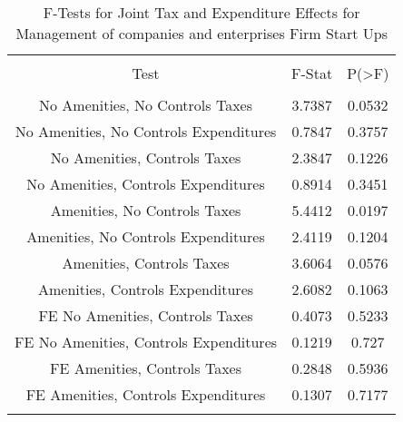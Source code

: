 
\begin{table}[!htbp] \centering 
  \caption{F-Tests for Joint Tax and Expenditure Effects for Management of companies and enterprises Firm Start Ups} 
  \label{55Ftests} 
\begin{tabular}{@{\extracolsep{5pt}} ccc} 
\\[-1.8ex]\hline 
\hline \\[-1.8ex] 
Test & F-Stat & P(\textgreater F) \\ 
\hline \\[-1.8ex] 
No Amenities, No Controls Taxes & 3.7387 & 0.0532 \\ 
No Amenities, No Controls Expenditures & 0.7847 & 0.3757 \\ 
No Amenities, Controls Taxes & 2.3847 & 0.1226 \\ 
No Amenities, Controls Expenditures & 0.8914 & 0.3451 \\ 
Amenities, No Controls Taxes & 5.4412 & 0.0197 \\ 
Amenities, No Controls Expenditures & 2.4119 & 0.1204 \\ 
Amenities, Controls Taxes & 3.6064 & 0.0576 \\ 
Amenities, Controls Expenditures & 2.6082 & 0.1063 \\ 
FE No Amenities, Controls Taxes & 0.4073 & 0.5233 \\ 
FE No Amenities, Controls Expenditures & 0.1219 & 0.727 \\ 
FE Amenities, Controls Taxes & 0.2848 & 0.5936 \\ 
FE Amenities, Controls Expenditures & 0.1307 & 0.7177 \\ 
\hline \\[-1.8ex] 
\end{tabular} 
\end{table} 
